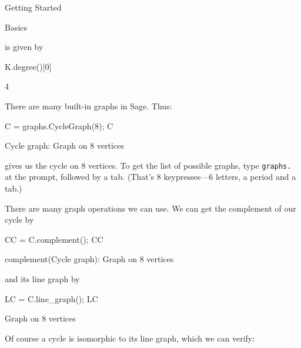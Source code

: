 \begin{chap}{Getting Started}
\begin{sect}{Basics}
\begin{para}
is given by
\end{para}
%
\begin{sagecode}
\begin{sageinput}
K.degree()[0]
\end{sageinput}
\begin{sageoutput}
4
\end{sageoutput}
\end{sagecode}
%
\begin{para}
There are many built-in graphs in Sage. Thus:
\end{para}
%
\begin{sagecode}
\begin{sageinput}
C = graphs.CycleGraph(8); C
\end{sageinput}
\begin{sageoutput}
Cycle graph: Graph on 8 vertices
\end{sageoutput}
\end{sagecode}
%
\begin{para}
gives us the cycle on 8 vertices. To get the list of possible graphs,
type \verb|graphs.| at the prompt, followed by a tab. (That's 8 keypresses---6 letters,
a period and a tab.)
\end{para}
%
\begin{para}
There are many graph operations we can use. We can get the complement of
our cycle by
\end{para}
%
\begin{sagecode}
\begin{sageinput}
CC = C.complement(); CC
\end{sageinput}
\begin{sageoutput}
complement(Cycle graph): Graph on 8 vertices
\end{sageoutput}
\end{sagecode}
%
\begin{para}
and its line graph by
\end{para}
%
\begin{sagecode}
\begin{sageinput}
LC = C.line_graph(); LC
\end{sageinput}
\begin{sageoutput}
Graph on 8 vertices
\end{sageoutput}
\end{sagecode}
%
\begin{para}
Of course a cycle is isomorphic to its line graph, which we can verify:
\end{para}
%
\begin{sagecode}

\end{sagecode}
\end{sect}
\end{chap}
